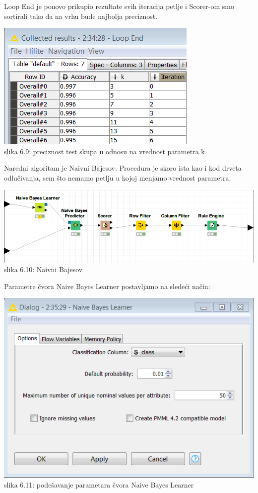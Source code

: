 \documentclass[10pt]{article}
\begin{document}
Loop End je ponovo prikupio rezultate svih iteracija petlje i Scorer-om smo sortirali tako da na vrhu bude najbolja preciznost.

\begin{center}
\includegraphics[scale = 0.8]{KNN2}\\
slika 6.9: preciznost test skupa u odnosu na vrednost parametra k\\
\end{center}

Naredni algoritam je Naivni Bajesov. Procedura je skoro ista kao i kod drveta odlu\v civanja, sem \v sto nemamo petlju u kojoj menjamo vrednost parametra.

\begin{center}
\includegraphics[width = \textwidth]{NB1}
slika 6.10: Naivni Bajesov\\
\end{center}

Parametre \v cvora Naive Bayes Learner postavljamo na slede\' ci na\v cin:

\begin{center}
\includegraphics[scale = 0.5]{NB2}\\
slika 6.11: pode\v savanje parametara \v cvora Naive Bayes Learner\\
\end{center}
\end{document}
